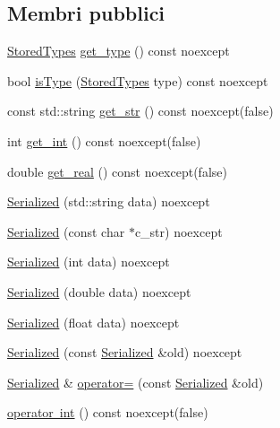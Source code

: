 \subsection*{Membri pubblici}
\begin{DoxyCompactItemize}
\item 
\mbox{\hyperlink{namespacemm_ad5a796af6d7145f51e84a73ed35a601c}{Stored\+Types}} \mbox{\hyperlink{structmm_1_1_serialized_a9a257b31c4426077a3bd460d1e6cbd89}{get\+\_\+type}} () const noexcept
\item 
bool \mbox{\hyperlink{structmm_1_1_serialized_ac0e23433a34f0d326042907895a03353}{is\+Type}} (\mbox{\hyperlink{namespacemm_ad5a796af6d7145f51e84a73ed35a601c}{Stored\+Types}} type) const noexcept
\item 
const std\+::string \mbox{\hyperlink{structmm_1_1_serialized_aa3eb7eb50d6b343993c08a4d369af8b2}{get\+\_\+str}} () const noexcept(false)
\item 
int \mbox{\hyperlink{structmm_1_1_serialized_a259c2695619d6ba052fd8a3885a341ef}{get\+\_\+int}} () const noexcept(false)
\item 
double \mbox{\hyperlink{structmm_1_1_serialized_acd3c339c1766f6dbc0313669e7582361}{get\+\_\+real}} () const noexcept(false)
\item 
\mbox{\hyperlink{structmm_1_1_serialized_a440d7e6daeb9e6c2ca286a2eee1fc24d}{Serialized}} (std\+::string data) noexcept
\item 
\mbox{\hyperlink{structmm_1_1_serialized_a1fcb5290740858b4a800f6b4d48e3c74}{Serialized}} (const char $\ast$c\+\_\+str) noexcept
\item 
\mbox{\hyperlink{structmm_1_1_serialized_a2d29dc6d2cb8eed1a768a378b1d61b8f}{Serialized}} (int data) noexcept
\item 
\mbox{\hyperlink{structmm_1_1_serialized_ae11ee0c67ffaed5dfc69bf52f33ebcca}{Serialized}} (double data) noexcept
\item 
\mbox{\hyperlink{structmm_1_1_serialized_a8e5cff9af77398dfa1f398a83bb9d642}{Serialized}} (float data) noexcept
\item 
\mbox{\hyperlink{structmm_1_1_serialized_af64564defb439c3167375d2984c0653d}{Serialized}} (const \mbox{\hyperlink{structmm_1_1_serialized}{Serialized}} \&old) noexcept
\item 
\mbox{\hyperlink{structmm_1_1_serialized}{Serialized}} \& \mbox{\hyperlink{structmm_1_1_serialized_a7d108150308172857962c61c94f78fbd}{operator=}} (const \mbox{\hyperlink{structmm_1_1_serialized}{Serialized}} \&old)
\item 
\mbox{\hyperlink{structmm_1_1_serialized_a47c193b8439645264f62af1887cbfb2f}{operator int}} () const noexcept(false)

\end{DoxyCompactItemize}
